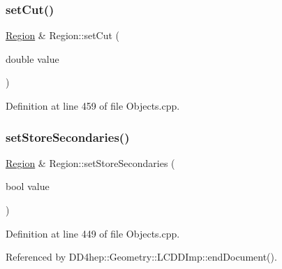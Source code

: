 \hypertarget{class_d_d4hep_1_1_geometry_1_1_region_ae4510bd7a92f89b49d161c67475c0350}{}\label{class_d_d4hep_1_1_geometry_1_1_region_ae4510bd7a92f89b49d161c67475c0350} 
\subsubsection{\texorpdfstring{set\+Cut()}{setCut()}}
{\footnotesize\ttfamily \hyperlink{class_d_d4hep_1_1_geometry_1_1_region}{Region} \& Region\+::set\+Cut (\begin{DoxyParamCaption}\item[{double}]{value }\end{DoxyParamCaption})}



Definition at line 459 of file Objects.\+cpp.

\hypertarget{class_d_d4hep_1_1_geometry_1_1_region_a491be77e5c4a5098fa1ae6acb8fac442}{}\label{class_d_d4hep_1_1_geometry_1_1_region_a491be77e5c4a5098fa1ae6acb8fac442} 
\subsubsection{\texorpdfstring{set\+Store\+Secondaries()}{setStoreSecondaries()}}
{\footnotesize\ttfamily \hyperlink{class_d_d4hep_1_1_geometry_1_1_region}{Region} \& Region\+::set\+Store\+Secondaries (\begin{DoxyParamCaption}\item[{bool}]{value }\end{DoxyParamCaption})}



Definition at line 449 of file Objects.\+cpp.



Referenced by D\+D4hep\+::\+Geometry\+::\+L\+C\+D\+D\+Imp\+::end\+Document().

\hypertarget{class_d_d4hep_1_1_geometry_1_1_region_a29293fa51db7f4469c51a7638a77043a}{}\label{class_d_d4hep_1_1_geometry_1_1_region_a29293fa51db7f4469c51a7638a77043a} 
